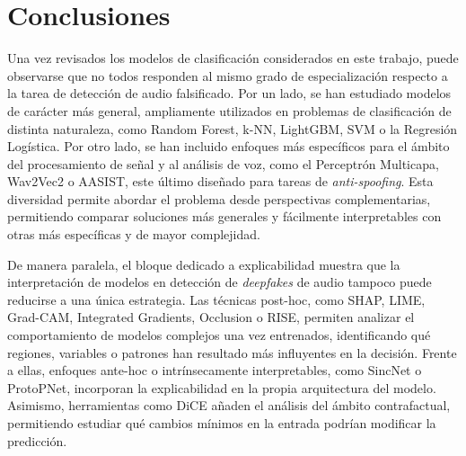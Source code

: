 

















\section{Conclusiones}
\label{sec:conc_eda}

Una vez revisados los modelos de clasificación considerados en este trabajo, puede observarse que no todos responden al mismo grado de especialización respecto a la tarea de detección de audio falsificado. Por un lado, se han estudiado modelos de carácter más general, ampliamente utilizados en problemas de clasificación de distinta naturaleza, como Random Forest, k-NN, LightGBM, SVM o la Regresión Logística. Por otro lado, se han incluido enfoques más específicos para el ámbito del procesamiento de señal y al análisis de voz, como el Perceptrón Multicapa, Wav2Vec2 o AASIST, este último diseñado para tareas de \textit{anti-spoofing}. Esta diversidad permite abordar el problema desde perspectivas complementarias, permitiendo comparar soluciones más generales y fácilmente interpretables con otras más específicas y de mayor complejidad.

De manera paralela, el bloque dedicado a explicabilidad muestra que la interpretación de modelos en detección de \textit{deepfakes} de audio tampoco puede reducirse a una única estrategia. Las técnicas post-hoc, como SHAP, LIME, Grad-CAM, Integrated Gradients, Occlusion o RISE, permiten analizar el comportamiento de modelos complejos una vez entrenados, identificando qué regiones, variables o patrones han resultado más influyentes en la decisión. Frente a ellas, enfoques ante-hoc o intrínsecamente interpretables, como SincNet o ProtoPNet, incorporan la explicabilidad en la propia arquitectura del modelo. Asimismo, herramientas como DiCE añaden el análisis del ámbito contrafactual, permitiendo estudiar qué cambios mínimos en la entrada podrían modificar la predicción.

